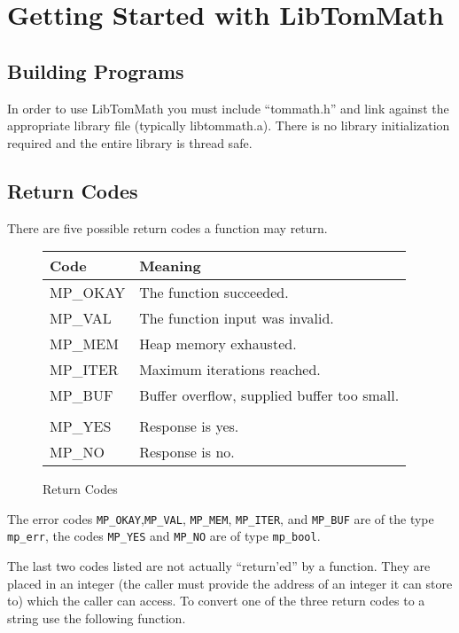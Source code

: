 \documentclass[synpaper]{book}
\begin{document}
\chapter{Getting Started with LibTomMath}
\section{Building Programs}
In order to use LibTomMath you must include ``tommath.h'' and link against the appropriate library file (typically
libtommath.a).  There is no library initialization required and the entire library is thread safe.

\section{Return Codes}
There are five possible return codes a function may return.

\begin{figure}[h!]
\begin{center}
\begin{small}
\begin{tabular}{|l|l|}
\hline \textbf{Code} & \textbf{Meaning} \\
\hline MP\_OKAY & The function succeeded. \\
\hline MP\_VAL  & The function input was invalid. \\
\hline MP\_MEM  & Heap memory exhausted. \\
\hline MP\_ITER  & Maximum iterations reached. \\
\hline MP\_BUF  & Buffer overflow, supplied buffer too small.\\
\hline &\\
\hline MP\_YES  & Response is yes. \\
\hline MP\_NO   & Response is no. \\
\hline
\end{tabular}
\end{small}
\end{center}
\caption{Return Codes}
\end{figure}

The error codes \texttt{MP\_OKAY},\texttt{MP\_VAL}, \texttt{MP\_MEM}, \texttt{MP\_ITER}, and \texttt{MP\_BUF} are of the type \texttt{mp\_err}, the codes \texttt{MP\_YES} and \texttt{MP\_NO} are of type \texttt{mp\_bool}.

The last two codes listed are not actually ``return'ed'' by a function.  They are placed in an integer (the caller must
provide the address of an integer it can store to) which the caller can access.  To convert one of the three return codes
to a string use the following function.
\end{document}

